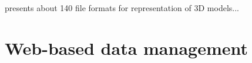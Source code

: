 


\cite{McHenry2008}  presents about 140 file formats for representation of 3D models...








\cite{VTK2015}
\cite{GiDPostProcess}
\newline
\cite{Ivanyi2012}


\section{Web-based data management}

\cite{Ari2013}
\cite{Yu2010}
\cite{Peng2003}
\cite{Heber2007I}
\cite{Heber2007II}
\cite{Weng2011}
\cite{Chen2008}

